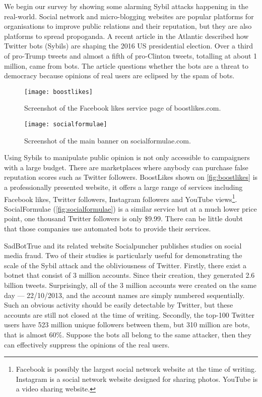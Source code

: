 We begin our survey by showing some alarming Sybil attacks happening in the
real-world. Social network and micro-blogging websites are popular platforms for
organisations to improve public relations and their reputation, but they are
also platforms to spread propoganda. A recent article in the Atlantic described
how Twitter bots (Sybils) are shaping the 2016 US presidential
election\cite{atlantictwitterbots}. Over a third of pro-Trump tweets and almost
a fifth of pro-Clinton tweets, totalling at about 1 million, came from bots. The
article questions whether the bots are a threat to democracy because opinions of
real users are eclipsed by the spam of bots.

\begin{figure}
  \centering
  \texttt{[image: boostlikes]}
  \caption{Screenshot of the Facebook likes service page of boostlikes.com.}
  \label{fig:boostlikes}
\end{figure}

\begin{figure*}
  \centering
  \texttt{[image: socialformulae]}
  \caption{Screenshot of the main banner on socialformulae.com.}
  \label{fig:socialformulae}
\end{figure*}

Using Sybils to manipulate public opinion is not only accessible to campaigners
with a large budget. There are marketplaces where anybody can purchase false
reputation scores such as Twitter followers. BoostLikes shown on
\autoref{fig:boostlikes} is a professionally presented website, it offers a
large range of services including Facebook likes, Twitter followers, Instagram
followers and YouTube views\footnote{Facebook is possibly the largest social
  network website at the time of writing. Instagram is a social network website
  designed for sharing photos. YouTube is a video sharing website.}.
SocialFormulae (\autoref{fig:socialformulae}) is a similar service but at a much
lower price point, one thousand Twitter followers is only \$9.99. There can be
little doubt that those companies use automated bots to provide their services.

SadBotTrue and its related website Socialpuncher publishes studies on social
media fraud. Two of their studies is particularly useful for demonstrating the
scale of the Sybil attack and the obliviousness of Twitter. Firstly, there exist
a botnet that consist of 3 million accounts. Since their creation, they
generated 2.6 billion tweets. Surprisingly, all of the 3 million accounts were
created on the same day --- 22/10/2013, and the account names are simply
numbered sequentially\cite{sadbottrue}. Such an obvious activity should be
easily detectable by Twitter, but these accounts are still not closed at the
time of writing. Secondly, the top-100 Twitter users have 523 million unique
followers between them, but 310 million are bots, that is almost
60\%\cite{socialpuncher}. Suppose the bots all belong to the same attacker, then
they can effectively suppress the opinions of the real users.

